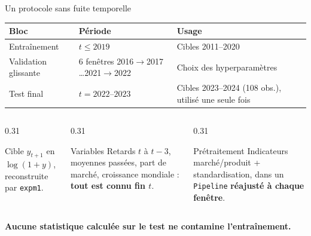 \documentclass[aspectratio=169,10pt]{beamer}
\begin{document}
\begin{frame}{Un protocole sans fuite temporelle}
  \begin{center}
    \begin{tabular}{@{}p{}p{}p{}@{}}
      \toprule
      \textbf{Bloc} & \textbf{Période} & \textbf{Usage} \\
      \midrule
      Entraînement & $t \leq 2019$ & Cibles 2011--2020 \\
      Validation glissante & 6 fenêtres 2016$\to$2017 \ldots 2021$\to$2022
        & Choix des hyperparamètres \\
      Test final & $t = 2022$--$2023$ & Cibles 2023--2024 (108 obs.), utilisé une seule fois \\
      \bottomrule
    \end{tabular}
  \end{center}

  \vspace{0.7em}
  \begin{columns}[T,onlytextwidth]
    \begin{column}{0.31\textwidth}
      \begin{block}{Cible}
        \small $y_{t+1}$ en $\log(1+y)$, reconstruite par \texttt{expm1}.
      \end{block}
    \end{column}
    \begin{column}{0.31\textwidth}
      \begin{block}{Variables}
        \small Retards $t$ à $t-3$, moyennes passées, part de marché,
        croissance mondiale : \textbf{tout est connu fin $t$}.
      \end{block}
    \end{column}
    \begin{column}{0.31\textwidth}
      \begin{block}{Prétraitement}
        \small Indicateurs marché/produit + standardisation, dans un
        \texttt{Pipeline} \textbf{réajusté à chaque fenêtre}.
      \end{block}
    \end{column}
  \end{columns}

  \vfill
  \small\color{vertfonce}\textbf{Aucune statistique calculée sur le test ne contamine l'entraînement.}
\end{frame}
\end{document}
